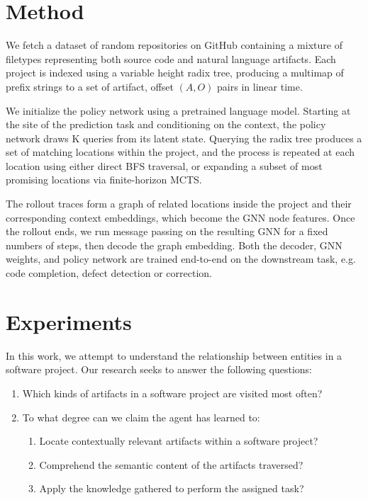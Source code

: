 \documentclass[11pt]{article}
\begin{document}
\section{Method}

We fetch a dataset of random repositories on GitHub containing a mixture of filetypes representing both source code and natural language artifacts. Each project is indexed using a variable height radix tree, producing a multimap of prefix strings to a set of artifact, offset $(A, O)$ pairs in linear time.

 We initialize the policy network using a pretrained language model. Starting at the site of the prediction task and conditioning on the context, the policy network draws K queries from its latent state. Querying the radix tree produces a set of matching locations within the project, and the process is repeated at each location using either direct BFS traversal, or expanding a subset of most promising locations via finite-horizon MCTS.

The rollout traces form a graph of related locations inside the project and their corresponding context embeddings, which become the GNN node features. Once the rollout ends, we run message passing on the resulting GNN for a fixed numbers of steps, then decode the graph embedding. Both the decoder, GNN weights, and policy network are trained end-to-end on the downstream task, e.g. code completion, defect detection or correction.

\section{Experiments}

In this work, we attempt to understand the relationship between entities in a software project. Our research seeks to answer the following questions:

\begin{enumerate}
  \item Which kinds of artifacts in a software project are visited most often?
  \item To what degree can we claim the agent has learned to:\begin{enumerate}
  \item Locate contextually relevant artifacts within a software project?
  \item Comprehend the semantic content of the artifacts traversed?
  \item Apply the knowledge gathered to perform the assigned task?
  \end{enumerate}
\end{enumerate}
\end{document}
